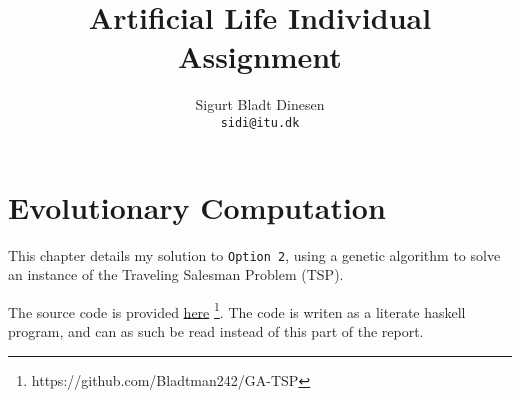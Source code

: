 \documentclass[a4paper, titlepage]{report}
\renewcommand{\%}{\scalebox{.9}{\oldpct}}
\begin{document}
\title{Artificial Life Individual Assignment}
\author{
	Sigurt Bladt Dinesen
	\\\texttt{sidi@itu.dk}
}

\maketitle

\tableofcontents
\chapter{Evolutionary Computation}
This chapter details my solution to \texttt{Option 2}, using a genetic algorithm
to solve an instance of the Traveling Salesman Problem (TSP).

The source code is provided \href{https://github.com/Bladtman242/GA-TSP}{here}
\footnote{https://github.com/Bladtman242/GA-TSP }. The code is writen as a
literate haskell program, and can as such be read instead of this part of the
report.
\end{document}
